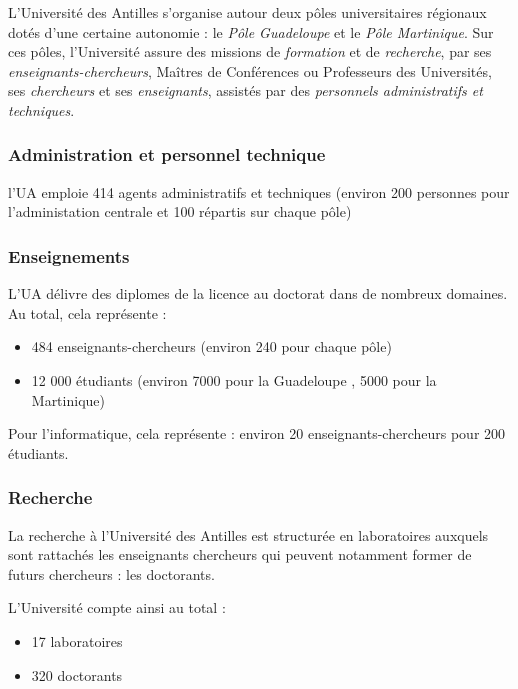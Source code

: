 L'Université des Antilles s'organise autour deux pôles universitaires
régionaux dotés d'une certaine autonomie : le \textit{Pôle Guadeloupe} et le \textit{Pôle Martinique}.
Sur ces pôles, l'Université assure des missions de \emph{formation} et
de \emph{recherche}, par ses \emph{enseignants-chercheurs}, Maîtres de Conférences ou Professeurs des Universités, ses \emph{chercheurs} et ses \emph{enseignants}, assistés par des \emph{personnels administratifs et
techniques}.

\hypertarget{administration-et-personnel-technique}{%
\subsubsection{Administration et personnel
technique}
\label{administration-et-personnel-technique}}

l'UA emploie 414 agents administratifs et techniques (environ 200 personnes
pour l'administation centrale et 100 répartis sur chaque pôle)

\hypertarget{enseignements}{%
\subsubsection{Enseignements}\label{enseignements}}

L'UA délivre des diplomes de la licence au doctorat dans de nombreux
domaines. Au total, cela représente :

\begin{itemize}
\tightlist
\item
  484 enseignants-chercheurs (environ 240 pour chaque pôle)
\item
  12 000 étudiants (environ 7000 pour la Guadeloupe , 5000 pour la
  Martinique)
\end{itemize}

Pour l'informatique, cela représente : environ 20
enseignants-chercheurs pour 200 étudiants.

\hypertarget{recherche}{%
\subsubsection{Recherche}\label{recherche}}

La recherche à l'Université des Antilles est structurée en laboratoires auxquels sont rattachés les
enseignants chercheurs qui peuvent notamment former de futurs chercheurs : les
doctorants.

L'Université compte ainsi au total :

\begin{itemize}
\tightlist
\item
  17 laboratoires
\item
  320 doctorants
\end{itemize}


